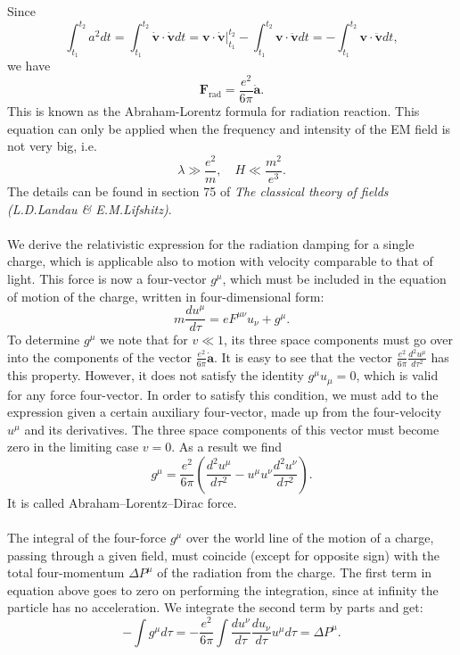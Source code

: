 Since
\[\int_{t_{1}}^{t_{2}}a^{2}dt = \int_{t_{1}}^{t_{2}}\dot{\bm{v}}\cdot\dot{\bm{v}}dt = \bm{v}\cdot\dot{\bm{v}}|_{t_{1}}^{t_{2}}-\int_{t_{1}}^{t_{2}}\bm{v} \cdot\ddot{\bm{v}}dt = -\int_{t_{1}}^{t_{2}}\bm{v} \cdot\ddot{\bm{v}}dt,\]
we have
\[\bm{F}_{\mathrm{rad}} = \frac{e^2}{6\pi} \dot{\bm{a}}.\]
This is known as the Abraham-Lorentz formula for radiation reaction. This equation can only be applied when the frequency and intensity of the EM field is not very big, i.e.
\[\lambda \gg \frac{e^2}{m} , \quad H \ll \frac{m^2}{e^3}.\]
The details can be found in section 75 of \emph{The classical theory of fields (L.D.Landau \& E.M.Lifshitz)}.
\\ \\
We derive the relativistic expression for the radiation damping for a single charge, which is applicable also to motion with velocity comparable to that of light. This force is now a four-vector $g^{\mu}$, which must be included in the equation of motion of the charge, written in four-dimensional form:
\[m\frac{du^{\mu}}{d\tau} = eF^{\mu\nu}u_{\nu} + g^{\mu}.\]
To determine $g^{\mu}$ we note that for $v \ll 1$, its three space components must go over into the components of the vector $\frac{e^2}{6\pi}\dot{\bm{a}}$. It is easy to see that the vector $\frac{e^2}{6\pi} \frac{d^2u^{\mu}}{d\tau^2}$ has this property. However, it does not satisfy the identity $g^{\mu}u_{\mu} = 0$, which is valid for any force four-vector. 
In order to satisfy this condition, we must add to the expression given a certain auxiliary four-vector, made up from the four-velocity $u^{\mu}$ and its derivatives. 
The three space components of this vector must become zero in the limiting case $v = 0$. As a result we find
\[g^{\mu} = \frac{e^2}{6\pi} \left( \frac{d^2u^{\mu}}{d\tau^2} -u^{\mu}u^{\nu}\frac{d^2u^{\nu}}{d\tau^2} \right).\]
It is called Abraham–Lorentz–Dirac force.
\\ \\
The integral of the four-force $g^{\mu}$ over the world line of the motion of a charge, passing through a given field, must coincide (except for opposite sign) with the total four-momentum $\Delta P^{\mu}$ of the radiation from the charge. 
The first term in equation above goes to zero on performing the integration, since at infinity the particle has no acceleration. We integrate the second term by parts and get:
\[-\int g^{\mu} d\tau = -\frac{e^2}{6\pi} \int \frac{du^{\nu}}{d\tau} \frac{du_{\nu}}{d\tau} u^{\mu}d\tau = \Delta P^{\mu}.\]

